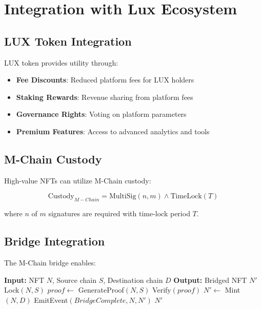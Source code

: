 \section{Integration with Lux Ecosystem}


\subsection{LUX Token Integration}

LUX token provides utility through:

\begin{itemize}
\item \textbf{Fee Discounts}: Reduced platform fees for LUX holders
\item \textbf{Staking Rewards}: Revenue sharing from platform fees
\item \textbf{Governance Rights}: Voting on platform parameters
\item \textbf{Premium Features}: Access to advanced analytics and tools
\end{itemize}

\subsection{M-Chain Custody}

High-value NFTs can utilize M-Chain custody:

\begin{equation}
\text{Custody}_{M-Chain} = \text{MultiSig}(n, m) \land \text{TimeLock}(T)
\end{equation}

where $n$ of $m$ signatures are required with time-lock period $T$.

\subsection{Bridge Integration}

The M-Chain bridge enables:

\begin{algorithm}
\caption{Cross-Chain NFT Bridge}
\begin{algorithmic}
\STATE \textbf{Input:} NFT $N$, Source chain $S$, Destination chain $D$
\STATE \textbf{Output:} Bridged NFT $N'$
\STATE
\STATE Lock$(N, S)$ 
\STATE $proof \leftarrow$ GenerateProof$(N, S)$
\STATE Verify$(proof)$ 
\STATE $N' \leftarrow$ Mint$(N, D)$ 
\STATE EmitEvent$(BridgeComplete, N, N')$
\RETURN $N'$
\end{algorithmic}
\end{algorithm}

